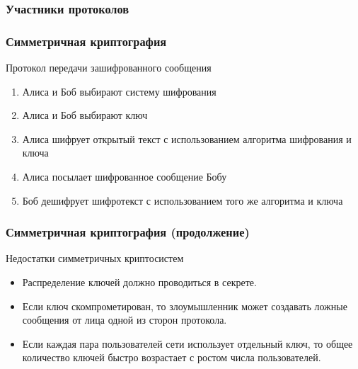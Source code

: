 \documentclass{beamer}
\begin{document}
\begin{frame}
  \frametitle{Участники протоколов}


\end{frame}


\begin{frame}
  \frametitle{Симметричная криптография}

  \begin{block}{Протокол передачи зашифрованного сообщения}
  \begin{enumerate}
    \item{Алиса и Боб выбирают систему шифрования}
    \item{Алиса и Боб выбирают ключ}
    \item{Алиса шифрует открытый текст с использованием алгоритма шифрования и ключа}
    \item{Алиса посылает шифрованное сообщение Бобу}
    \item{Боб дешифрует шифротекст с использованием того же алгоритма и ключа}
  \end{enumerate}
  \end{block}
\end{frame}


\begin{frame}
  \frametitle{Симметричная криптография (продолжение)}

  \begin{block} {Недостатки симметричных криптосистем}
  \begin{itemize}
    \item{Распределение ключей должно проводиться в секрете.}
    \item{Если ключ скомпрометирован, то злоумышленник может создавать ложные сообщения от лица одной из сторон протокола.}
    \item{Если каждая пара пользователей сети использует отдельный ключ, то общее количество ключей быстро 
          возрастает с ростом числа пользователей.}
  \end{itemize}
  \end{block}
\end{frame}
\end{document}
